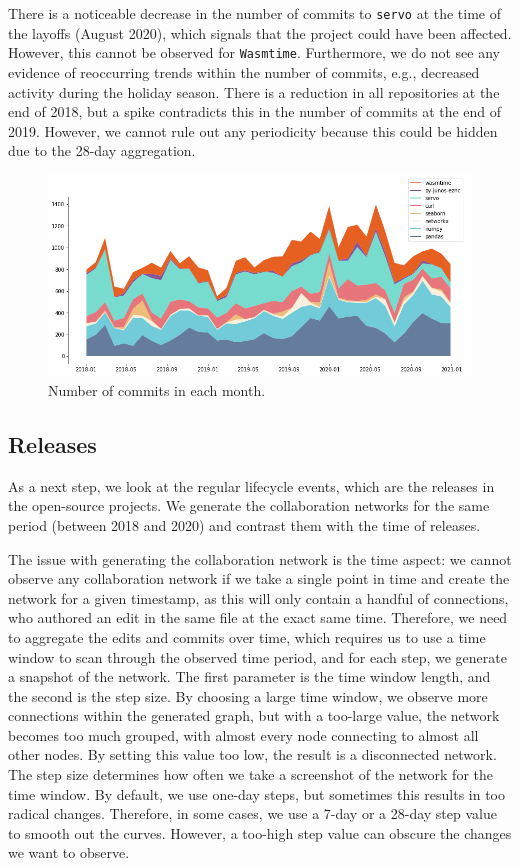 There is a noticeable decrease in the number of commits to \texttt{servo} at the time of the layoffs (August 2020), which signals that the project could have been affected. However, this cannot be observed for \texttt{Wasmtime}. Furthermore, we do not see any evidence of reoccurring trends within the number of commits, e.g., decreased activity during the holiday season. There is a reduction in all repositories at the end of 2018, but a spike contradicts this in the number of commits at the end of 2019. However, we cannot rule out any periodicity because this could be hidden due to the 28-day aggregation.

\begin{figure}[!htbp]
    \centering
    \includegraphics[width=\textwidth]{figures/commits.png}
    \caption{Number of commits in each month.}
    \label{fig:commits}
\end{figure}

\subsection{Releases}
\label{sec:releases}
As a next step, we look at the regular lifecycle events, which are the releases in the open-source projects. We generate the collaboration networks for the same period (between 2018 and 2020) and contrast them with the time of releases.

The issue with generating the collaboration network is the time aspect: we cannot observe any collaboration network if we take a single point in time and create the network for a given timestamp, as this will only contain a handful of connections, who authored an edit in the same file at the exact same time. Therefore, we need to aggregate the edits and commits over time, which requires us to use a time window to scan through the observed time period, and for each step, we generate a snapshot of the network. The first parameter is the time window length, and the second is the step size. By choosing a large time window, we observe more connections within the generated graph, but with a too-large value, the network becomes too much grouped, with almost every node connecting to almost all other nodes. By setting this value too low, the result is a disconnected network. The step size determines how often we take a screenshot of the network for the time window. By default, we use one-day steps, but sometimes this results in too radical changes. Therefore, in some cases, we use a 7-day or a 28-day step value to smooth out the curves. However, a too-high step value can obscure the changes we want to observe.


